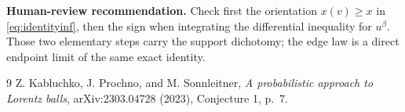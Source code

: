 \documentclass[10pt]{article}
\begin{document}
\textbf{Human-review recommendation.}  Check first the orientation
$x(v)\ge x$ in \eqref{eq:identityinf}, then the sign when integrating the
differential inequality for $u^\beta$.  Those two elementary steps carry the
support dichotomy; the edge law is a direct endpoint limit of the same exact
identity.

\begin{thebibliography}{9}
Z. Kabluchko, J. Prochno, and M. Sonnleitner,
\emph{A probabilistic approach to Lorentz balls},
arXiv:2303.04728 (2023), Conjecture 1, p.~7.
\end{thebibliography}
\end{document}
